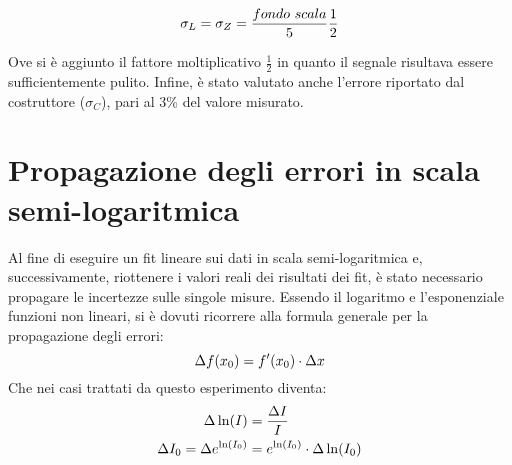 \documentclass[@SRC@/main]{subfiles}
\begin{document}
        \begin{equation*}
            \sigma_L = \sigma_Z = \frac{fondo\textnormal{ }scala}{5} \frac{1}{2}
        \end{equation*}

    \noindent Ove si è aggiunto il fattore moltiplicativo $\frac{1}{2}$ in quanto il segnale risultava
    essere sufficientemente pulito.\newline\newline
    \noindent Infine, è stato valutato anche l'errore riportato dal costruttore ($\sigma_C$), pari
    al 3\% del valore misurato.
\vspace{0.05cm}
    \section{Propagazione degli errori in scala semi-logaritmica}
    \label{sec:propagazione-errori-log}

    Al fine di eseguire un fit lineare sui dati in scala semi-logaritmica e, successivamente,
    riottenere i valori reali dei risultati dei fit, è stato necessario propagare le incertezze
    sulle singole misure.
    Essendo il logaritmo e l'esponenziale funzioni non lineari, si è
    dovuti ricorrere alla formula generale per la propagazione degli
    errori:
    \begin{equation*}
        \Delta f(x_0) = f'(x_0) \cdot \Delta x
        \vspace{2pt}
    \end{equation*}
    Che nei casi trattati da questo esperimento diventa:
    \begin{align*}
        \vspace{4pt}
        \Delta \ln (I) &= \frac{\Delta I}{I} \\
        \Delta I_0 = \Delta e^{\ln (I_0)} &= e^{\ln (I_0)}
        \cdot \Delta \ln (I_0)
    \end{align*}
\end{document}
